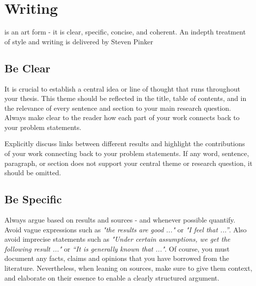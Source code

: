 \documentclass{../sharedAssets/tufte}
\begin{document}
\chapter{Writing}



 is an art form - it is clear, specific, concise, and coherent. 
An indepth treatment of style and writing is delivered by Steven Pinker \cite{PinkerSenseOfStyle2014}

\bigskip
\section{Be Clear}
It is crucial to establish a central idea or line of thought that runs throughout your thesis. 
This theme should be reflected in the title, table of contents, and in the relevance of every sentence and section to your main research question. 
Always make clear to the reader how each part of your work connects back to your problem statements.


Explicitly discuss links between different results and highlight the contributions of your work connecting back to your problem statements.
If any word, sentence, paragraph, or section does not support your central theme or research question, it should be omitted.



\section{Be Specific}
Always argue based on results and sources - and whenever possible quantify. 
Avoid vague expressions such as \textit{"the results are good ..."} or \textit{"I feel that ...”}.
Also avoid imprecise statements such as \textit{"Under certain assumptions, we get the following result ..."} or \textit{“It is generally known that ..."}. 
Of course, you must document any facts, claims and opinions that you have borrowed from the literature. 
Nevertheless, when leaning on sources, make sure to give them context, and elaborate on their essence to enable a clearly structured argument.
\end{document}
